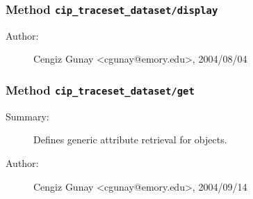 \subsubsection[Method \texttt{display}]{Method \texttt{cip\_traceset\_dataset/display}}%
%
\label{ref_cip_traceset_dataset__display}%
\hypertarget{ref_cip_traceset_dataset__display}{}%
\begin{description}
%
%
%
%
%
%
%
\item[Author:]%
Cengiz Gunay <cgunay@emory.edu>, 2004/08/04
%
\end{description}
\methodline%
\subsubsection[Method \texttt{get}]{Method \texttt{cip\_traceset\_dataset/get}}%
%
\label{ref_cip_traceset_dataset__get}%
\hypertarget{ref_cip_traceset_dataset__get}{}%
\begin{description}
\item[Summary:]Defines generic attribute retrieval for objects.
%
%
%
%
%
%
%
\item[Author:]%
Cengiz Gunay <cgunay@emory.edu>, 2004/09/14
%
\end{description}
\methodline%
